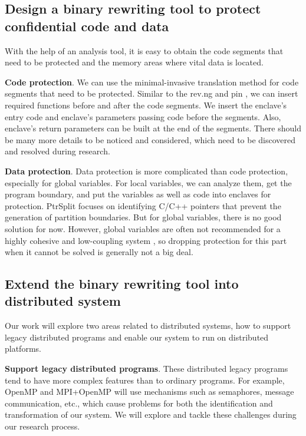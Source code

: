 \subsection{Design a binary rewriting tool to protect confidential code and data}
\label{sec:ToolToRewrite}
With the help of an analysis tool, it is easy to obtain the code segments that need
to be protected and the memory areas where vital data is located.

\textbf{Code protection}. We can use the minimal-invasive translation method for
code segments that need to be protected. Similar to the rev.ng \cite{Federico2017revngAU}
and pin \cite{Luk2005PinBC}, we can insert required functions before and
after the code segments. We insert the enclave's entry code and enclave's parameters passing code
before the segments. Also, enclave's return parameters can be built at the end of the segments.
There should be many more details to be noticed and considered, which need to be
discovered and resolved during research.

\textbf{Data protection}. Data protection is more complicated than code protection,
especially for global variables.
For local variables, we can analyze them, get the program boundary,
and put the variables as well as code into enclaves for protection.
PtrSplit \cite{Liu2017PtrSplitSG} focuses on identifying C/C++ pointers
that prevent the generation of partition boundaries.
But for global variables, there is no good solution for now. However,
global variables are often not recommended for a highly cohesive and low-coupling system
\cite{GlobalVariablesAreBad, GlobalVariablesAreEvil},
so dropping protection for this part when it cannot be solved is generally not a big deal.

\subsection{Extend the binary rewriting tool into distributed system}
\label{sec:ToolToDistributedSystem}
Our work will explore two areas related to distributed systems, how to support legacy distributed
programs and enable our system to run on distributed platforms.

\textbf{Support legacy distributed programs}.
These distributed legacy programs tend to have more complex features
than to ordinary programs.
For example, OpenMP \cite{Dagum1998OpenMPAI} and MPI+OpenMP \cite{Klinkenberg2020CHAMELEONRL}
will use mechanisms such as semaphores, message communication, etc., which cause problems
for both the identification and transformation of our system.
We will explore and tackle these challenges during our research process.


